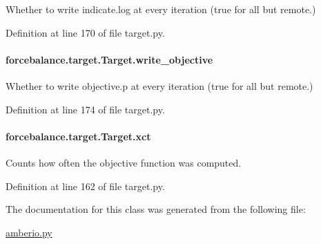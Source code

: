 Whether to write indicate.\-log at every iteration (true for all but remote.) 



Definition at line 170 of file target.\-py.

\hypertarget{classforcebalance_1_1target_1_1Target_a7a95624dfe03f0cee0e5f1ae09db306a}{
\paragraph[{write\-\_\-objective}]{\setlength{\rightskip}{0pt plus 5cm}forcebalance.\-target.\-Target.\-write\-\_\-objective\hspace{0.3cm}{\ttfamily [inherited]}}}\label{classforcebalance_1_1target_1_1Target_a7a95624dfe03f0cee0e5f1ae09db306a}


Whether to write objective.\-p at every iteration (true for all but remote.) 



Definition at line 174 of file target.\-py.

\hypertarget{classforcebalance_1_1target_1_1Target_aad2e385cfbf7b4a68f1c2cb41133fe82}{
\paragraph[{xct}]{\setlength{\rightskip}{0pt plus 5cm}forcebalance.\-target.\-Target.\-xct\hspace{0.3cm}{\ttfamily [inherited]}}}\label{classforcebalance_1_1target_1_1Target_aad2e385cfbf7b4a68f1c2cb41133fe82}


Counts how often the objective function was computed. 



Definition at line 162 of file target.\-py.



The documentation for this class was generated from the following file\-:\begin{DoxyCompactItemize}
\item 
\hyperlink{amberio_8py}{amberio.\-py}\end{DoxyCompactItemize}
